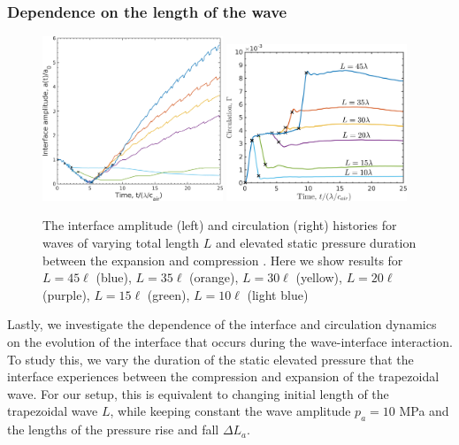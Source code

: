 \documentclass{article}
\begin{document}
\subsubsection{Dependence on the length of the wave}%
\begin{figure}[h]
  \centering
  \includegraphics[width=0.48\textwidth]{./figs/lung_figs/interface_multi-lag}
  \includegraphics[width=0.48\textwidth]{./figs/lung_figs/circulation_multi-lag_fixed}
  \caption[The interface and circulation dependence on wave
  duration]{The interface amplitude (left) and circulation (right)
    histories for waves of varying total length $L$ and elevated
    static pressure duration between the expansion and compression
    . Here we show results for $L=45\ell$ (blue), $L=35\ell$
    (orange), $L=30\ell$ (yellow), $L=20\ell$ (purple),
    $L=15\ell$ (green), $L=10\ell$ (light blue)}
  \label{fig:trapz_circ_interface_multi-lag}
\end{figure}
Lastly, we investigate the dependence of the interface and circulation
dynamics on the evolution of the interface that occurs during the
wave-interface interaction. To study this, we vary the duration of the
static elevated pressure that the interface experiences between the
compression and expansion of the trapezoidal wave. For our setup, this
is equivalent to changing initial length of the trapezoidal wave $L$,
while keeping constant the wave amplitude $p_a=10$ MPa and the lengths
of the pressure rise and fall $\Delta L_a$. 
\end{document}
